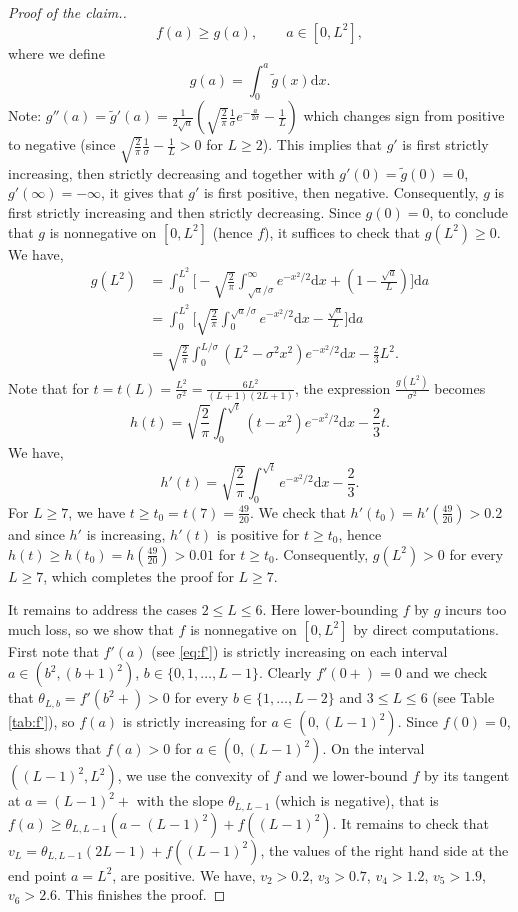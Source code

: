\documentclass[10pt]{article}
\newcommand{\dd}{\mathrm{d}}
\newcommand{\1}{\textbf{1}}
\theoremstyle{remark}
\theoremstyle{definition}
\begin{document}
\begin{proof}[Proof of the claim.]
\[
f(a) \geq g(a), \qquad a \in [0,L^2],
\]
where we define
\[
g(a) = \int_0^a \tilde g(x)\dd x.
\]
Note: $g''(a) = \tilde g'(a) = \frac{1}{2\sqrt{a}}\left(\sqrt{\frac{2}{\pi}}\frac{1}{\sigma}e^{-\frac{a}{2\sigma}} - \frac{1}{L}\right)$ which changes sign from positive to negative (since $\sqrt{\frac{2}{\pi}}\frac{1}{\sigma} - \frac{1}{L} > 0$ for $L \geq 2$). This implies that $g'$ is first strictly increasing, then strictly decreasing and together with $g'(0) = \tilde g(0) = 0$, $g'(\infty) = -\infty$, it gives that $g'$ is first positive, then negative. Consequently, $g$ is first strictly increasing and then strictly decreasing. Since $g(0) = 0$, to conclude that $g$ is nonnegative on $[0,L^2]$ (hence $f$), it suffices to check that $g(L^2) \geq 0$. We have,
\begin{align*}
g(L^2) &= \int_0^{L^2}\Bigg[-\sqrt{\frac{2}{\pi}}\int_{\sqrt{a}/\sigma}^{\infty}e^{-x^2/2}\dd x + \left(1 - \frac{\sqrt{a}}{L}\right)\Bigg] \dd a \\
&=\int_0^{L^2}\Bigg[\sqrt{\frac{2}{\pi}}\int_{0}^{\sqrt{a}/\sigma}e^{-x^2/2}\dd x - \frac{\sqrt{a}}{L} \Bigg] \dd a \\
&= \sqrt{\frac{2}{\pi}}\int_0^{L/\sigma} (L^2-\sigma^2x^2)e^{-x^2/2} \dd x - \frac{2}{3}L^2.
\end{align*}
Note that for $t = t(L) = \frac{L^2}{\sigma^2} = \frac{6L^2}{(L+1)(2L+1)}$, the expression $\frac{g(L^2)}{\sigma^2}$ becomes
\[
h(t) = \sqrt{\frac{2}{\pi}}\int_0^{\sqrt{t}} (t-x^2)e^{-x^2/2} \dd x - \frac{2}{3}t.
\]
We have,
\[
h'(t) = \sqrt{\frac{2}{\pi}}\int_0^{\sqrt{t}} e^{-x^2/2} \dd x - \frac{2}{3}.
\]
For $L \geq 7$, we have $t \geq t_0 = t(7) = \frac{49}{20}$. We check that $h'(t_0) = h'(\frac{49}{20})> 0.2$ and since $h'$ is increasing, $h'(t)$ is positive for $t \geq t_0$, hence $h(t) \geq h(t_0) = h(\frac{49}{20}) > 0.01$ for $t \geq t_0$. Consequently, $g(L^2) > 0$ for every $L \geq 7$, which completes the proof for $L \geq 7$.

It remains to address the cases $2 \leq L \leq 6$. Here lower-bounding $f$ by $g$ incurs too much loss, so we show that $f$ is nonnegative on $[0,L^2]$ by direct computations. First note that $f'(a)$ (see \eqref{eq:f'}) is strictly increasing on each interval $a \in (b^2,(b+1)^2)$, $b \in \{0,1,\ldots, L-1\}$. Clearly $f'(0+) = 0$ and we check that $\theta_{L,b} = f'(b^2+) > 0$ for every $b \in \{1,\ldots,L-2\}$ and $3 \leq L \leq 6$ (see Table \ref{tab:f'}), so $f(a)$ is strictly increasing for $a \in (0,(L-1)^2)$. Since $f(0) = 0$, this shows that $f(a) > 0$ for $a \in (0,(L-1)^2)$. On the interval $((L-1)^2,L^2)$, we use the convexity of $f$ and we lower-bound $f$ by its tangent at $a = (L-1)^2+$ with the slope $\theta_{L,L-1}$ (which is negative), that is $f(a) \geq \theta_{L,L-1}(a - (L-1)^2) + f((L-1)^2)$. It remains to check that $v_L = \theta_{L,L-1}(2L-1) + f((L-1)^2)$, the values of the right hand side at the end point $a = L^2$, are positive. We have, $v_2 > 0.2$, $v_3 > 0.7$, $v_4 > 1.2$, $v_5 > 1.9$, $v_6 > 2.6$. This finishes the proof.
\end{proof}
\end{document}
